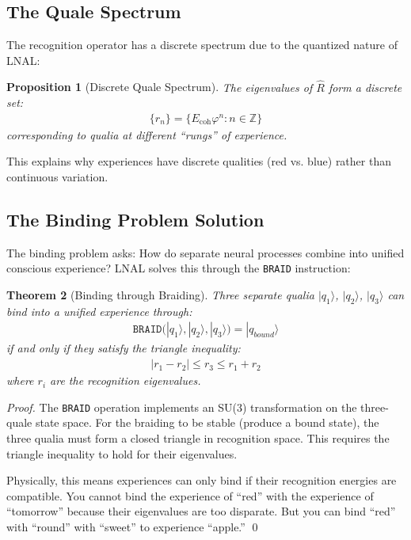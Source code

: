 \documentclass[12pt,a4paper]{article}
\newtheorem{theorem}{Theorem}[section]
\newtheorem{proposition}[theorem]{Proposition}
\newcommand{\Z}{\mathbb{Z}}
\newcommand{\ecoh}{E_{\text{coh}}}
\newcommand{\opcmd}[1]{\texttt{#1}}
\begin{document}
\subsection{The Quale Spectrum}

The recognition operator has a discrete spectrum due to the quantized nature of LNAL:

\begin{proposition}[Discrete Quale Spectrum]
The eigenvalues of $\hat{R}$ form a discrete set:
\begin{align}
\{r_n\} = \{\ecoh \varphi^n : n \in \Z\}
\end{align}
corresponding to qualia at different ``rungs'' of experience.
\end{proposition}

This explains why experiences have discrete qualities (red vs. blue) rather than continuous variation.

\subsection{The Binding Problem Solution}

The binding problem asks: How do separate neural processes combine into unified conscious experience? LNAL solves this through the \opcmd{BRAID} instruction:

\begin{theorem}[Binding through Braiding]
Three separate qualia $|q_1\rangle$, $|q_2\rangle$, $|q_3\rangle$ can bind into a unified experience through:
\begin{align}
\opcmd{BRAID}(|q_1\rangle, |q_2\rangle, |q_3\rangle) = |q_{bound}\rangle
\end{align}
if and only if they satisfy the triangle inequality:
\begin{align}
|r_1 - r_2| \leq r_3 \leq r_1 + r_2
\end{align}
where $r_i$ are the recognition eigenvalues.
\end{theorem}

\begin{proof}
The \opcmd{BRAID} operation implements an SU(3) transformation on the three-quale state space. For the braiding to be stable (produce a bound state), the three qualia must form a closed triangle in recognition space. This requires the triangle inequality to hold for their eigenvalues. 

Physically, this means experiences can only bind if their recognition energies are compatible. You cannot bind the experience of ``red'' with the experience of ``tomorrow'' because their eigenvalues are too disparate. But you can bind ``red'' with ``round'' with ``sweet'' to experience ``apple.'' \qed
\end{proof}
\end{document}
